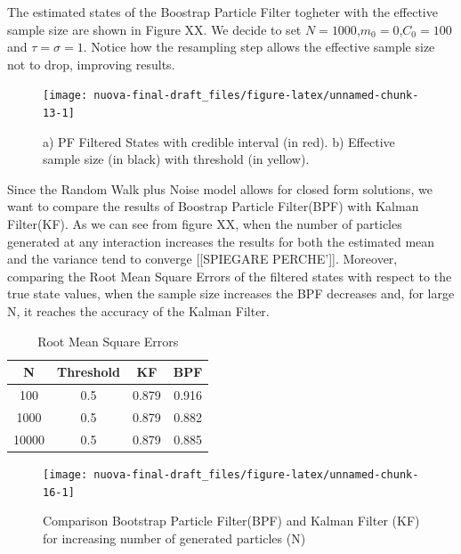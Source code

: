 \documentclass[
]{book}
\theoremstyle{break}
\theoremstyle{nonumberplain}
\begin{document}
The estimated states of the Boostrap Particle Filter togheter with the
effective sample size are shown in Figure XX. We decide to set
\(N=1000\),\(m_{0}=0\),\(C_{0}=100\) and \(\tau=\sigma=1\). Notice how
the resampling step allows the effective sample size not to drop,
improving results.

\begin{figure}[H]

{\centering \texttt{[image: nuova-final-draft\_files/figure-latex/unnamed-chunk-13-1]} 

}

\caption{a) PF Filtered States with credible interval (in red). b) Effective sample size (in black) with threshold (in yellow).}\label{fig:unnamed-chunk-13}
\end{figure}

Since the Random Walk plus Noise model allows for closed form solutions,
we want to compare the results of Boostrap Particle Filter(BPF) with
Kalman Filter(KF). As we can see from figure XX, when the number of
particles generated at any interaction increases the results for both
the estimated mean and the variance tend to converge {[}{[}SPIEGARE
PERCHE'{]}{]}. Moreover, comparing the Root Mean Square Errors of the
filtered states with respect to the true state values, when the sample
size increases the BPF decreases and, for large N, it reaches the
accuracy of the Kalman Filter.

\begin{longtable}[t]{cccc}
\caption{\label{tab:unnamed-chunk-15}Root Mean Square Errors}\\
\toprule
N & Threshold & KF & BPF\\
\midrule
100 & 0.5 & 0.879 & 0.916\\
1000 & 0.5 & 0.879 & 0.882\\
10000 & 0.5 & 0.879 & 0.885\\
\bottomrule
\end{longtable}

\begin{figure}[H]

{\centering \texttt{[image: nuova-final-draft\_files/figure-latex/unnamed-chunk-16-1]} 

}

\caption{Comparison Bootstrap Particle Filter(BPF) and Kalman Filter (KF) for increasing number of generated particles (N)}\label{fig:unnamed-chunk-16}
\end{figure}

\hfill\break
\end{document}
